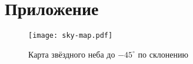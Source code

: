 \newpage

\section*{Приложение}
\renewcommand{\leftmark}[1]{Приложение}

\begin{figure}[h!]
    \centering
    \vspace{-.5pc}
    \texttt{[image: sky-map.pdf]}
    \caption{Карта звёздного неба до $-45^\circ$ по склонению}
    \vspace{-1cm}
\end{figure}
